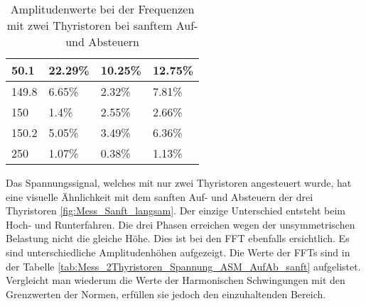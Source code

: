 \begin{table}[ht!]
\begin{tabular}{|l|l|l|l|}
		50.1              & 22.29\%                                                                             & 10.25\%                                                                             & 12.75\%                                                                             \\ \hline
		149.8             & 6.65\%                                                                              & 2.32\%                                                                              & 7.81\%                                                                              \\ \hline
		150               & 1.4\%                                                                               & 2.55\%                                                                              & 2.66\%                                                                              \\ \hline
		150.2             & 5.05\%                                                                              & 3.49\%                                                                              & 6.36\%                                                                              \\ \hline
		250             & 1.07\%                                                                              & 0.38\%                                                                              & 1.13\%                                                                              \\ \hline
		
	\end{tabular}
\caption{Amplitudenwerte bei der Frequenzen mit zwei Thyristoren bei sanftem Auf- und Absteuern}\label{tab:Mess_2Thyristoren_Spannung_Widerstand_AufAb_sanft}
\end{table}

Das Spannungssignal, welches mit nur zwei Thyristoren angesteuert wurde, hat eine visuelle Ähnlichkeit mit dem sanften Auf- und Absteuern der drei Thyristoren \ref{fig:Mess_Sanft_langsam}. Der einzige Unterschied entsteht beim Hoch- und Runterfahren. Die drei Phasen erreichen wegen der unsymmetrischen Belastung nicht die gleiche Höhe. Dies ist bei den FFT ebenfalls ersichtlich. Es sind unterschiedliche Amplitudenhöhen aufgezeigt. Die Werte der FFTs sind in der Tabelle \ref{tab:Mess_2Thyristoren_Spannung_ASM_AufAb_sanft} aufgelistet. Vergleicht man wiederum die Werte der Harmonischen Schwingungen mit den Grenzwerten der Normen, erfüllen sie jedoch den einzuhaltenden Bereich.


